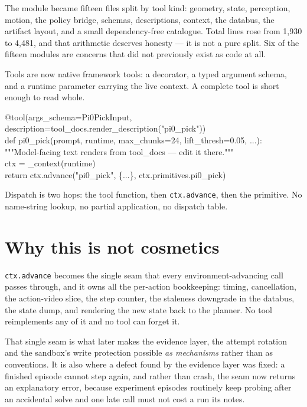 \documentclass[11pt,a4paper]{report}
\begin{document}
The module became fifteen files split by tool kind: geometry, state, perception,
motion, the policy bridge, schemas, descriptions, context, the databus, the
artifact layout, and a small dependency-free catalogue. Total lines rose from
1{,}930 to 4{,}481, and that arithmetic deserves honesty --- it is not a pure
split. Six of the fifteen modules are concerns that did not previously exist as
code at all.

Tools are now native framework tools: a decorator, a typed argument schema, and
a runtime parameter carrying the live context. A complete tool is short enough
to read whole.

\begin{evidence}[title={A tool, start to finish}]
\ttfamily\footnotesize
@tool(args\_schema=Pi0PickInput, description=tool\_docs.render\_description("pi0\_pick"))\\
def pi0\_pick(prompt, runtime, max\_chunks=24, lift\_thresh=0.05, ...):\\
\hspace*{2em}"""Model-facing text renders from tool\_docs --- edit it there."""\\
\hspace*{2em}ctx = \_context(runtime)\\
\hspace*{2em}return ctx.advance("pi0\_pick", \{...\}, ctx.primitives.pi0\_pick)
\end{evidence}

\noindent
Dispatch is two hops: the tool function, then \texttt{ctx.advance}, then the
primitive. No name-string lookup, no partial application, no dispatch table.

\section{Why this is not cosmetics}

\texttt{ctx.advance} becomes the single seam that every
environment-advancing call passes through, and it owns all the per-action
bookkeeping: timing, cancellation, the action-video slice, the step counter, the
staleness downgrade in the databus, the state dump, and rendering the new state
back to the planner. No tool reimplements any of it and no tool can forget it.

That single seam is what later makes the evidence layer, the attempt rotation
and the sandbox's write protection possible \emph{as mechanisms} rather than as
conventions. It is also where a defect found by the evidence layer was fixed: a
finished episode cannot step again, and rather than crash, the seam now returns
an explanatory error, because experiment episodes routinely keep probing after
an accidental solve and one late call must not cost a run its notes.
\end{document}
